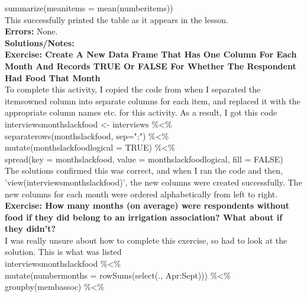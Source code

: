 \documentclass{article}
\begin{document}
\begin{FlushLeft}
summarize(mean\textunderscore items = mean(number\textunderscore items))\\
This successfully printed the table as it appears in the lesson.\\
\textbf{Errors:} None.\\
\textbf{Solutions/Notes:}\\
\vspace{5mm}
\textbf{Exercise: Create A New Data Frame That Has One Column For Each Month And Records TRUE Or FALSE For Whether The Respondent Had Food That Month}\\ 
To complete this activity, I copied the code from when I separated the items\textunderscore owned column into separate columns for each item, and replaced it with the appropriate column names etc. for this activity. As a result, I got this code\\
interviews\textunderscore months\textunderscore lack\textunderscore food \textless - interviews \%\textless\%\\
separate\textunderscore rows(months\textunderscore lack\textunderscore food, sep=";") \%\textless\%\\
mutate(months\textunderscore lack\textunderscore food\textunderscore logical = TRUE) \%\textless\%\\
spread(key = months\textunderscore lack\textunderscore food, value = months\textunderscore lack\textunderscore food\textunderscore logical, fill = FALSE)\\
The solutions confirmed this was correct, and when I ran the code and then, 'view(interviews\textunderscore months\textunderscore lack\textunderscore food)', the new columns were created successfully. The new columns for each month were ordered alphabetically from left to right.\\
\vspace{5mm}
\textbf{Exercise: How many months (on average) were respondents without food if they did belong to an irrigation association? What about if they didn’t?}\\ 
I was really unsure about how to complete this exercise, so had to look at the solution. This is what was listed\\
interviews\textunderscore months\textunderscore lack\textunderscore food \%\textless\%\\
mutate(number\textunderscore months = rowSums(select(., Apr:Sept))) \%\textless\%\\
group\textunderscore by(memb\textunderscore assoc) \%\textless\%\\

\end{FlushLeft}
\end{document}
